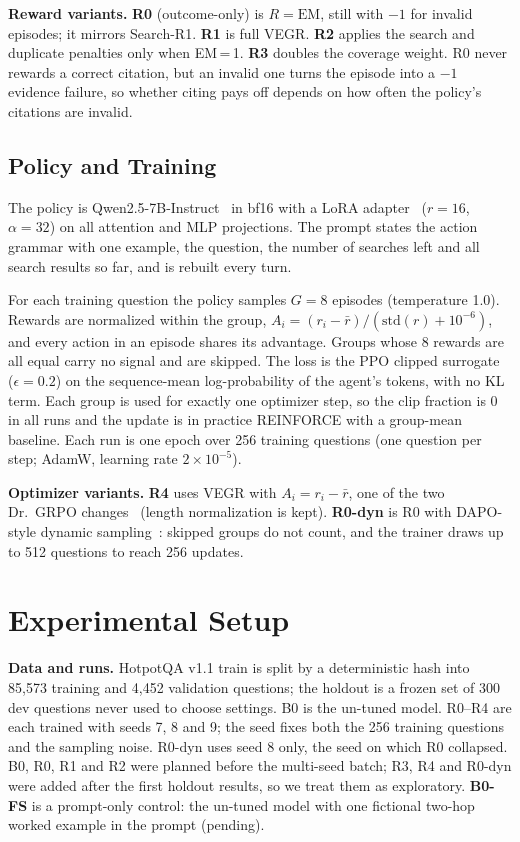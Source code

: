 \documentclass[conference]{IEEEtran}
\begin{document}
\textbf{Reward variants.} \textbf{R0} (outcome-only) is $R=\mathrm{EM}$, still with $-1$ for invalid episodes; it mirrors Search-R1. \textbf{R1} is full VEGR. \textbf{R2} applies the search and duplicate penalties only when EM\,=\,1. \textbf{R3} doubles the coverage weight. R0 never rewards a correct citation, but an invalid one turns the episode into a $-1$ evidence failure, so whether citing pays off depends on how often the policy's citations are invalid.

\subsection{Policy and Training}
The policy is Qwen2.5-7B-Instruct~\cite{qwen2024qwen25} in bf16 with a LoRA adapter~\cite{hu2022lora} ($r=16$, $\alpha=32$) on all attention and MLP projections. The prompt states the action grammar with one example, the question, the number of searches left and all search results so far, and is rebuilt every turn.

For each training question the policy samples $G=8$ episodes (temperature 1.0). Rewards are normalized within the group, $A_i=(r_i-\bar r)/(\mathrm{std}(r)+10^{-6})$, and every action in an episode shares its advantage. Groups whose 8 rewards are all equal carry no signal and are skipped. The loss is the PPO clipped surrogate~\cite{schulman2017ppo} ($\epsilon=0.2$) on the sequence-mean log-probability of the agent's tokens, with no KL term. Each group is used for exactly one optimizer step, so the clip fraction is 0 in all runs and the update is in practice REINFORCE with a group-mean baseline. Each run is one epoch over 256 training questions (one question per step; AdamW, learning rate $2\times10^{-5}$).

\textbf{Optimizer variants.} \textbf{R4} uses VEGR with $A_i=r_i-\bar r$, one of the two Dr.\ GRPO changes~\cite{liu2025drgrpo} (length normalization is kept). \textbf{R0-dyn} is R0 with DAPO-style dynamic sampling~\cite{yu2025dapo}: skipped groups do not count, and the trainer draws up to 512 questions to reach 256 updates.

\section{Experimental Setup}
\label{sec:setup}

\textbf{Data and runs.} HotpotQA v1.1 train is split by a deterministic hash into 85{,}573 training and 4{,}452 validation questions; the holdout is a frozen set of 300 dev questions never used to choose settings. B0 is the un-tuned model. R0--R4 are each trained with seeds 7, 8 and 9; the seed fixes both the 256 training questions and the sampling noise. R0-dyn uses seed 8 only, the seed on which R0 collapsed. B0, R0, R1 and R2 were planned before the multi-seed batch; R3, R4 and R0-dyn were added after the first holdout results, so we treat them as exploratory. \textbf{B0-FS} is a prompt-only control: the un-tuned model with one fictional two-hop worked example in the prompt\ifnum{} (pending)\fi.
\end{document}
